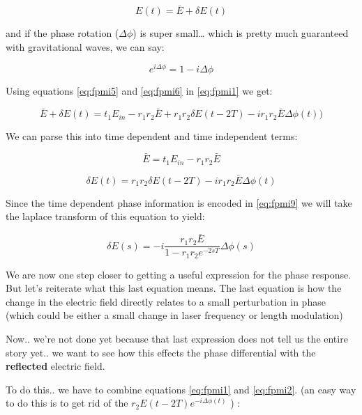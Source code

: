\begin{equation} \label{eq:fpmi5} E(t) = \bar{E} + \delta E(t) \end{equation}

and if the phase rotation (\(\Delta \phi\)) is super small\ldots{} which
is pretty much guaranteed with gravitational waves, we can say:

\begin{equation} \label{eq:fpmi6} e^{i\Delta \phi} = 1- i \Delta \phi \end{equation}

\noindent Using equations \ref{eq:fpmi5} and \ref{eq:fpmi6} in \ref{eq:fpmi1} we get:

\begin{equation} \bar{E} + \delta E(t) = t_1 E_{in} -r_1r_2\bar{E} + r_1r_2 \delta E(t-2T) - ir_1r_2\bar{E}\Delta \phi(t)) \end{equation}

\noindent We can parse this into time dependent and time independent terms:

\begin{equation} \bar{E} = t_1 E_{in} -r_1r_2\bar{E} \end{equation}

\begin{equation} \label{eq:fpmi9} \delta E(t) = r_1r_2 \delta E(t-2T) - ir_1r_2\bar{E}\Delta \phi(t) \end{equation}

\noindent Since the time dependent phase information is encoded in \ref{eq:fpmi9} we
will take the laplace transform of this equation to yield:

\begin{equation}\delta E(s) = -i \frac{r_1r_2 \bar{E}}{1-r_1r_2e^{-2sT}} \Delta \phi(s)\end{equation}

We are now one step closer to getting a useful expression
for the phase response. But let's reiterate what this last equation means. The last equation is how the change in the electric field directly relates to a small perturbation in phase (which could be either a small
change in laser frequency or length modulation)

Now.. we're not done yet because that last expression does not tell us
the entire story yet.. we want to see how this effects the phase
differential with the \textbf{reflected} electric field.

To do this.. we have to combine equations \ref{eq:fpmi1} and \ref{eq:fpmi2}. (an
easy way to do this is to get rid of the $ r_2 E(t - 2T) e^{-i \Delta \phi(t)} $ ) :

